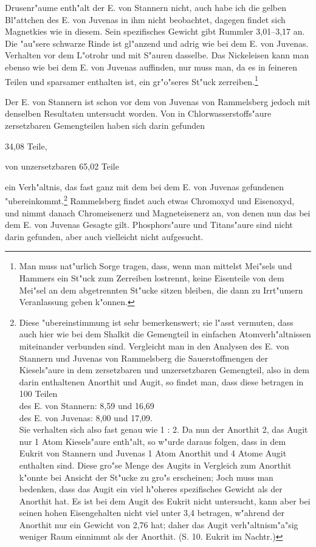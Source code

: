\documentclass[a4paper, 11pt, oneside, german]{article}
\begin{document}
Drusenr"aume enth"alt der E. von Stannern nicht, auch habe ich die gelben Bl"attchen des E. von Juvenas in ihm nicht beobachtet, dagegen findet sich Magnetkies wie in diesem. Sein spezifisches Gewicht gibt Rummler 3,01--3,17 an. Die "au"sere schwarze Rinde ist gl"anzend und adrig wie bei dem E. von Juvenas. Verhalten vor dem L"otrohr und mit S"auren dasselbe. Das Nickeleisen kann man ebenso wie bei dem E. von Juvenas auffinden, nur muss man, da es in feineren Teilen und sparsamer enthalten ist, ein gr"o"seres St"uck zerreiben.\footnote{Man muss nat"urlich Sorge tragen, dass, wenn man mittelst Mei"sels und Hammers ein St"uck zum Zerreiben lostrennt, keine Eisenteile von dem Mei"sel an dem abgetrennten St"ucke sitzen bleiben, die dann zu Irrt"umern Veranlassung geben k"onnen.}

Der E. von Stannern ist schon vor dem von Juvenas von Rammelsberg jedoch mit denselben Resultaten untersucht worden. Von in Chlorwasserstoffs"aure zersetzbaren Gemengteilen haben sich darin gefunden
\begin{center}
34,08 Teile,
\end{center}
\begin{center}
von unzersetzbaren 65,02 Teile
\end{center}
ein Verh"altnis, das fast ganz mit dem bei dem E. von Juvenas gefundenen "ubereinkommt.\footnote{Diese "ubereinstimmung ist sehr bemerkenswert; sie l"asst vermuten, dass auch hier wie bei dem Shalkit die Gemengteil in einfachen Atomverh"altnissen miteinander verbunden sind. Vergleicht man in den Analysen des E. von Stannern und Juvenas von Rammelsberg die Sauerstoffmengen der Kiesels"aure in dem zersetzbaren und unzersetzbaren Gemengteil, also in dem darin enthaltenen Anorthit und Augit, so findet man, dass diese betragen in 100 Teilen\\
des E. von Stannern: 8,59 und 16,69\\
des E. von Juvenas: 8,00 und 17,09.\\
Sie verhalten sich also fast genau wie 1 : 2. Da nun der Anorthit 2, das Augit nur 1 Atom Kiesels"aure enth"alt, so w"urde daraus folgen, dass in dem Eukrit von Stannern und Juvenas 1 Atom Anorthit und 4 Atome Augit enthalten sind. Diese gro"se Menge des Augits in Vergleich zum Anorthit k"onnte bei Ansicht der St"ucke zu gro"s erscheinen; Joch muss man bedenken, dass das Augit ein viel h"oheres spezifisches Gewicht als der Anorthit hat. Es ist bei dem Augit des Eukrit nicht untersucht, kann aber bei seinen hohen Eisengehalten nicht viel unter 3,4 betragen, w"ahrend der Anorthit nur ein Gewicht von 2,76 hat; daher das Augit verh"altnism"a"sig weniger Raum einnimmt als der Anorthit. (S. 10. Eukrit im Nachtr.)} Rammelsberg findet auch etwas Chromoxyd und Eisenoxyd, und nimmt danach Chromeisenerz und Magneteisenerz an, von denen nun das bei dem E. von Juvenas Gesagte gilt. Phosphors"aure und Titans"aure sind nicht darin gefunden, aber auch vielleicht nicht aufgesucht.
\end{document}
